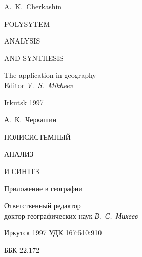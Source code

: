 \documentclass[14pt,draft,openany]{extbook}
\begin{document}

\begingroup
\thispagestyle{empty}
\mbox{}

\ptsans
\vspace{13ex}
\centering\large
\noindent{}A.~K.~Cherkashin

\vspace{6ex}

{\Huge\bfseries

POLYSYTEM

ANALYSIS

AND SYNTHESIS

}
\vspace{1em}

The application in geography
\\[0.7em]
{\normalsize{} Editor {\itshape{} V.~S.~Mikheev}}
\vfill{}

Irkutsk 1997
\mbox{}
\endgroup
\newpage
\begingroup
\mbox{}
\thispagestyle{empty}

\ptsans
\vspace{13ex}
\centering\large
\noindent{}А.~К.~Черкашин

\vspace{6ex}

{\Huge\bfseries

ПОЛИСИСТЕМНЫЙ

АНАЛИЗ

И СИНТЕЗ

}
\vspace{1em}

Приложение в географии
\vspace{1em}

{\normalsize\parskip0pt
Ответственный редактор\\[-0.5em] доктор географических наук {\itshape В.~С.~Михеев}}
\vfill{}

Иркутск 1997
\mbox{}
\endgroup
\newpage{}
\begingroup
\newcommand\sucopyright{{\ptserif\copyright}}
\newcommand\ISBN{ISBN 5--02--030607--X}
\thispagestyle{empty}
\noindent{}УДК 167:510:910

\noindent{}ББК 22.172

\vspace{2em}
\end{document}
